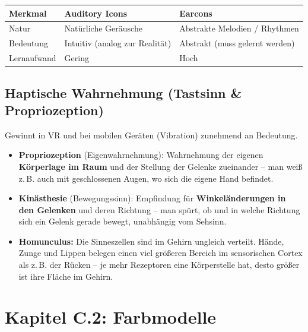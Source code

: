 \documentclass[12pt, a4paper]{article}
\begin{document}
\begin{center}
\begin{tabular}{p{3cm} p{5cm} p{5cm}}
\hline
\textbf{Merkmal} & \textbf{Auditory Icons} & \textbf{Earcons} \\
\hline
Natur       & Natürliche Geräusche           & Abstrakte Melodien / Rhythmen \\[3pt]
Bedeutung   & Intuitiv (analog zur Realität) & Abstrakt (muss gelernt werden) \\[3pt]
Lernaufwand & Gering                         & Hoch \\
\hline
\end{tabular}
\end{center}

\subsection{Haptische Wahrnehmung (Tastsinn \& Propriozeption)}

Gewinnt in VR und bei mobilen Geräten (Vibration) zunehmend an Bedeutung.

\begin{itemize}
  \item \textbf{Propriozeption} (\glqq{}Eigenwahrnehmung\grqq{}): Wahrnehmung der
        eigenen \textbf{Körperlage im Raum} und der Stellung der Gelenke zueinander
        -- man weiß z.\,B. auch mit geschlossenen Augen, wo sich die eigene Hand
        befindet.
  \item \textbf{Kinästhesie} (\glqq{}Bewegungssinn\grqq{}): Empfindung für
        \textbf{Winkeländerungen in den Gelenken} und deren Richtung -- man spürt,
        ob und in welche Richtung sich ein Gelenk gerade bewegt, unabhängig vom
        Sehsinn.
  \item \textbf{Homunculus:} Die Sinneszellen sind im Gehirn ungleich verteilt.
        Hände, Zunge und Lippen belegen einen viel größeren Bereich im sensorischen
        Cortex als z.\,B. der Rücken -- je mehr Rezeptoren eine Körperstelle hat,
        desto größer ist ihre \glqq{}Fläche\grqq{} im Gehirn.
\end{itemize}


\section{Kapitel C.2: Farbmodelle}
\end{document}
